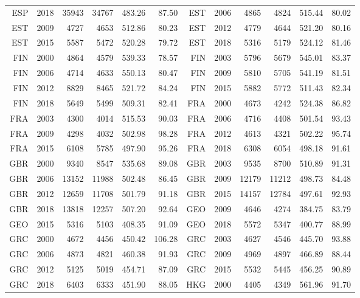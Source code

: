 {\begin{longtable}{r|r|r|r|r|r||r|r|r|r|r|r}
    ESP   & 2018  & 35943 & 34767 & 483.26 & 87.50 & EST   & 2006  & 4865  & 4824  & 515.44 & 80.02 \\
    EST   & 2009  & 4727  & 4653  & 512.86 & 80.23 & EST   & 2012  & 4779  & 4644  & 521.20 & 80.16 \\
    EST   & 2015  & 5587  & 5472  & 520.28 & 79.72 & EST   & 2018  & 5316  & 5179  & 524.12 & 81.46 \\
    FIN   & 2000  & 4864  & 4579  & 539.33 & 78.57 & FIN   & 2003  & 5796  & 5679  & 545.01 & 83.37 \\
    FIN   & 2006  & 4714  & 4633  & 550.13 & 80.47 & FIN   & 2009  & 5810  & 5705  & 541.19 & 81.51 \\
    FIN   & 2012  & 8829  & 8465  & 521.72 & 84.24 & FIN   & 2015  & 5882  & 5772  & 511.43 & 82.34 \\
    FIN   & 2018  & 5649  & 5499  & 509.31 & 82.41 & FRA   & 2000  & 4673  & 4242  & 524.38 & 86.82 \\
    FRA   & 2003  & 4300  & 4014  & 515.53 & 90.03 & FRA   & 2006  & 4716  & 4408  & 501.54 & 93.43 \\
    FRA   & 2009  & 4298  & 4032  & 502.98 & 98.28 & FRA   & 2012  & 4613  & 4321  & 502.22 & 95.74 \\
    FRA   & 2015  & 6108  & 5785  & 497.90 & 95.26 & FRA   & 2018  & 6308  & 6054  & 498.18 & 91.61 \\
    GBR   & 2000  & 9340  & 8547  & 535.68 & 89.08 & GBR   & 2003  & 9535  & 8700  & 510.89 & 91.31 \\
    GBR   & 2006  & 13152 & 11988 & 502.48 & 86.45 & GBR   & 2009  & 12179 & 11212 & 498.73 & 84.48 \\
    GBR   & 2012  & 12659 & 11708 & 501.79 & 91.18 & GBR   & 2015  & 14157 & 12784 & 497.61 & 92.93 \\
    GBR   & 2018  & 13818 & 12257 & 507.20 & 92.64 & GEO   & 2009  & 4646  & 4274  & 384.75 & 83.79 \\
    GEO   & 2015  & 5316  & 5103  & 408.35 & 91.09 & GEO   & 2018  & 5572  & 5347  & 400.77 & 88.99 \\
    GRC   & 2000  & 4672  & 4456  & 450.42 & 106.28 & GRC   & 2003  & 4627  & 4546  & 445.70 & 93.88 \\
    GRC   & 2006  & 4873  & 4821  & 460.38 & 91.93 & GRC   & 2009  & 4969  & 4897  & 466.89 & 88.44 \\
    GRC   & 2012  & 5125  & 5019  & 454.71 & 87.09 & GRC   & 2015  & 5532  & 5445  & 456.25 & 90.89 \\
    GRC   & 2018  & 6403  & 6333  & 451.90 & 88.05 & HKG   & 2000  & 4405  & 4349  & 561.96 & 91.70 \\

\end{longtable}}
